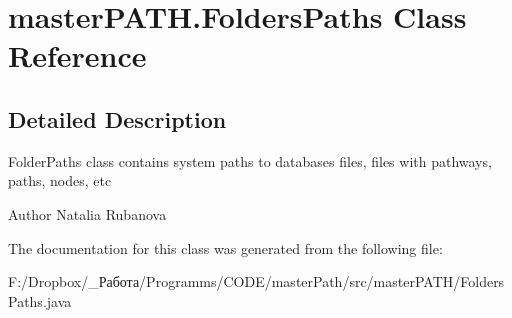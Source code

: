 \section{master\+P\+A\+T\+H.\+Folders\+Paths Class Reference}
\label{classmaster_p_a_t_h_1_1_folders_paths}


\subsection{Detailed Description}
Folder\+Paths class contains system paths to databases files, files with pathways, paths, nodes, etc \begin{DoxyAuthor}{Author}
Natalia Rubanova 
\end{DoxyAuthor}


The documentation for this class was generated from the following file\+:\begin{DoxyCompactItemize}
\item 
F\+:/\+Dropbox/\+\_\+Работа/\+Programms/\+C\+O\+D\+E/master\+Path/src/master\+P\+A\+T\+H/Folders\+Paths.\+java\end{DoxyCompactItemize}
